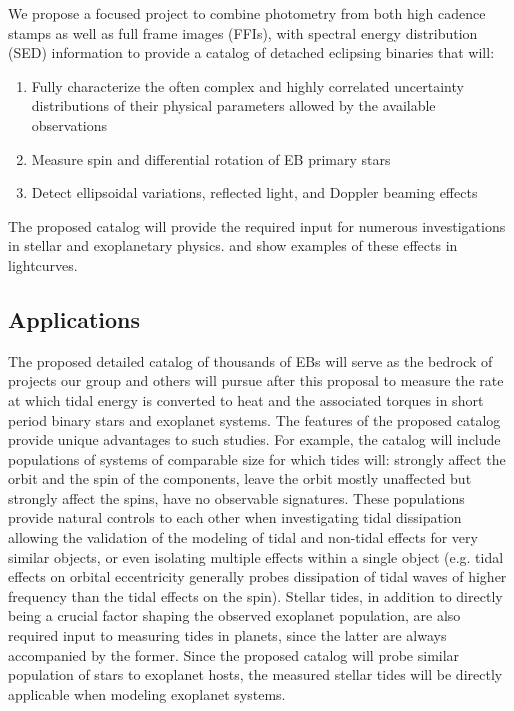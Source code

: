 %
\label{sec:objectives_and_significance}

We propose a focused project to combine \tess{} photometry from both high
cadence stamps as well as full frame images (FFIs), with spectral energy
distribution (SED) information to provide a catalog of detached eclipsing
binaries that will:

\begin{enumerate}
%
    \item Fully characterize the often complex and highly correlated uncertainty
        distributions of their physical parameters allowed by the available
        observations
%
    \item Measure spin and differential rotation of \tess{} EB primary stars
%
    \item Detect ellipsoidal variations, reflected light, and Doppler beaming
        effects
%
\end{enumerate}

The proposed catalog will provide the required input for numerous investigations
in stellar and exoplanetary physics.  and
 show examples of these effects in \tess{} lightcurves.

\subsection{Applications}
%
\label{sec:applications}

The proposed detailed catalog of thousands of EBs will serve as the bedrock of
projects our group and others will pursue after this proposal to measure the
rate at which tidal energy is converted to heat and the associated torques in
short period binary stars and exoplanet systems. The features of the proposed
catalog provide unique advantages to such studies. For example, the catalog will
include populations of systems of comparable size for which tides will: strongly
affect the orbit and the spin of the components, leave the orbit mostly
unaffected but strongly affect the spins, have no observable signatures. These
populations provide natural controls to each other when investigating tidal
dissipation allowing the validation of the modeling of tidal and non-tidal
effects for very similar objects, or even isolating multiple effects within a
single object (e.g. tidal effects on orbital eccentricity generally probes
    dissipation of tidal waves of higher frequency than the tidal effects on the
spin). Stellar tides, in addition to directly being a crucial factor shaping the
observed exoplanet population, are also required input to measuring tides in
planets, since the latter are always accompanied by the former. Since the
proposed catalog will probe similar population of stars to exoplanet hosts, the
measured stellar tides will be directly applicable when modeling exoplanet
systems.

